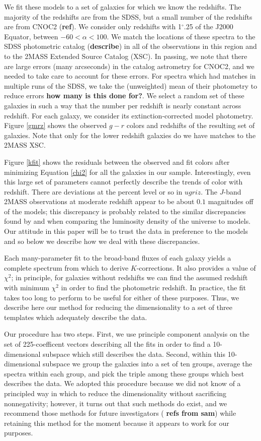 \documentclass[10pt,preprint]{aastex}
\begin{document}
We fit these models to a set of galaxies for which we know the
redshifts. The majority of the redshifts are from the SDSS, but a
small number of the redshifts are from CNOC2 ({\bf ref}). We consider
only redshifts with 1$^\circ$.25 of the J2000 Equator, between
$-60<\alpha<100$. We match the locations of these spectra to the SDSS
photometric catalog ({\bf describe}) in all of the observations in
this region and to the 2MASS Extended Source Catalog (XSC). In
passing, we note that there are large errors (many arcseconds) in the
catalog astrometry for CNOC2, and we needed to take care to account
for these errors. For spectra which had matches in multiple runs of
the SDSS, we take the (unweighted) mean of their photometry to reduce
errors {\bf how many is this done for?}. We select a random set of
these galaxies in such a way that the number per redshift is nearly
constant across redshift. For each galaxy, we consider its
extinction-corrected model photometry. Figure \ref{gmrz} shows the
observed $g-r$ colors and redshifts of the resulting set of
galaxies. Note that only for the lower redshift galaxies do we have
matches to the 2MASS XSC.

Figure \ref{kfit} shows the residuals between the observed and fit
colors after minimizing Equation \ref{chi2} for all the galaxies in
our sample. Interestingly, even this large set of parameters cannot
perfectly describe the trends of color with redshift. There are
deviations at the percent level or so in $ugriz$. The $J$-band 2MASS
observations at moderate redshift appear to be about $0.1$ magnitudes
off of the models; this discrepancy is probably related to the similar
discrepancies found by \citet{blanton03d} and \citet{baldry03a} when
comparing the luminosity density of the universe to models.  Our
attitude in this paper will be to trust the data in preference to the
models and so below we describe how we deal with these discrepancies.

Each many-parameter fit to the broad-band fluxes of each galaxy yields
a complete spectrum from which to derive $K$-corrections. It also
provides a value of $\chi^2$; in principle, for galaxies without
redshifts we can find the assumed redshift with minimum $\chi^2$ in
order to find the photometric redshift. In practice, the fit takes too
long to perform to be useful for either of these purposes. Thus, we
describe here our method for reducing the dimensionality to a set of
three templates which adequately describe the data.

Our procedure has two steps. First, we use principle component
analysis on the set of 225-coefficent vectors describing all the fits
in order to find a 10-dimensional subspace which still describes the
data. Second, within this 10-dimensional subspace we group the
galaxies into a set of ten groups, average the spectra within each
group, and pick the triple among these groups which best describes the
data. We adopted this procedure because we did not know of a
principled way in which to reduce the dimensionality without
sacrificing nonnegativity; however, it turns out that such methods do
exist, and we recommend those methods for future investigators ({\bf
refs from sam}) while retaining this method for the moment because it
appears to work for our purposes.
\end{document}
